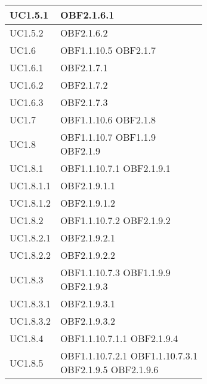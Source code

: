 \documentclass{scalatekids-article}
\begin{document}
\begin{longtable}[H]{|p{5.5cm}|p{5.5cm}|}
\hline
UC1.5.1 & \multiLineCell[t]{OBF2.1.6.1\\}\\
\hline
UC1.5.2 & \multiLineCell[t]{OBF2.1.6.2\\}\\
\hline
UC1.6 & \multiLineCell[t]{OBF1.1.10.5 OBF2.1.7\\}\\
\hline
UC1.6.1 & \multiLineCell[t]{OBF2.1.7.1\\}\\
\hline
UC1.6.2 & \multiLineCell[t]{OBF2.1.7.2\\}\\
\hline
UC1.6.3 & \multiLineCell[t]{OBF2.1.7.3\\}\\
\hline
UC1.7 & \multiLineCell[t]{OBF1.1.10.6 OBF2.1.8\\}\\
\hline
UC1.8 & \multiLineCell[t]{OBF1.1.10.7 OBF1.1.9\\OBF2.1.9}\\
\hline
UC1.8.1 & \multiLineCell[t]{OBF1.1.10.7.1 OBF2.1.9.1\\}\\
\hline
UC1.8.1.1 & \multiLineCell[t]{OBF2.1.9.1.1\\}\\
\hline
UC1.8.1.2 & \multiLineCell[t]{OBF2.1.9.1.2\\}\\
\hline
UC1.8.2 & \multiLineCell[t]{OBF1.1.10.7.2 OBF2.1.9.2\\}\\
\hline
UC1.8.2.1 & \multiLineCell[t]{OBF2.1.9.2.1\\}\\
\hline
UC1.8.2.2 & \multiLineCell[t]{OBF2.1.9.2.2\\}\\
\hline
UC1.8.3 & \multiLineCell[t]{OBF1.1.10.7.3 OBF1.1.9.9\\OBF2.1.9.3}\\
\hline
UC1.8.3.1 & \multiLineCell[t]{OBF2.1.9.3.1\\}\\
\hline
UC1.8.3.2 & \multiLineCell[t]{OBF2.1.9.3.2\\}\\
\hline
UC1.8.4 & \multiLineCell[t]{OBF1.1.10.7.1.1 OBF2.1.9.4\\}\\
\hline
UC1.8.5 & \multiLineCell[t]{OBF1.1.10.7.2.1 OBF1.1.10.7.3.1\\OBF2.1.9.5 OBF2.1.9.6\\}\\

\end{longtable}
\end{document}
